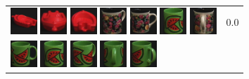 \begin{figure}[!bp]
\begin{tabular}{m{11cm} | m{3cm} |}
\includegraphics[width=1cm]{coil/beeld-22.eps}
\includegraphics[width=1cm]{coil/beeld-20.eps}
\includegraphics[width=1cm]{coil/beeld-23.eps}
\includegraphics[width=1cm]{coil/beeld-63.eps}
\includegraphics[width=1cm]{coil/beeld-60.eps}
\includegraphics[width=1cm]{coil/beeld-32.eps}
\includegraphics[width=1cm]{coil/beeld-65.eps}
& {\scriptsize 0.0}
\\
\includegraphics[width=1cm]{coil/beeld-30.eps}
\includegraphics[width=1cm]{coil/beeld-32.eps}
\includegraphics[width=1cm]{coil/beeld-33.eps}
\includegraphics[width=1cm]{coil/beeld-35.eps}
\includegraphics[width=1cm]{coil/beeld-34.eps}

\end{tabular}
\end{figure}
